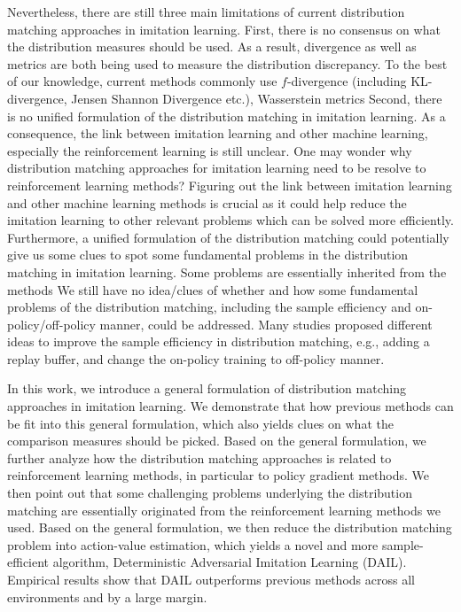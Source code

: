 Nevertheless, there are still three main limitations of current distribution matching approaches in imitation learning. 
First, there is no consensus on what the distribution measures should be used. 
As a result, divergence as well as metrics are both being used to measure the distribution discrepancy. 
To the best of our knowledge, current methods commonly use $f$-divergence (including KL-divergence, Jensen Shannon Divergence etc.), Wasserstein metrics
Second, there is no unified formulation of the distribution matching in imitation learning. 
As a consequence, the link between imitation learning and other machine learning, especially the reinforcement learning is still unclear. 
One may wonder why distribution matching approaches for imitation learning need to be resolve to reinforcement learning methods?
Figuring out the link between imitation learning and other machine learning methods is crucial as it could help reduce the imitation learning to other relevant problems which can be solved more efficiently. 
Furthermore, a unified formulation of the distribution matching could potentially give us some clues to spot some fundamental problems in the distribution matching in imitation learning. 
Some problems are essentially inherited from the methods 
We still have no idea/clues of whether and how some fundamental problems of the distribution matching, including the sample efficiency and on-policy/off-policy manner, could be addressed. 
Many studies proposed different ideas to improve the sample efficiency in distribution matching, e.g., adding a replay buffer,  and change the on-policy training to off-policy manner. 


In this work, we introduce a general formulation of distribution matching approaches in imitation learning. 
We demonstrate that how previous methods can be fit into this general formulation, 
which also yields clues on what the comparison measures should be picked. 
Based on the general formulation, we further analyze how the distribution matching approaches is related to reinforcement learning methods, in particular to policy gradient methods. 
We then point out that some challenging problems underlying the distribution matching are essentially originated from the reinforcement learning methods we used. 
Based on the general formulation, we then reduce the distribution matching problem into action-value estimation, which yields a novel and more sample-efficient algorithm, Deterministic Adversarial Imitation Learning (DAIL). 
Empirical results show that DAIL outperforms previous methods across all environments and by a large margin. 
